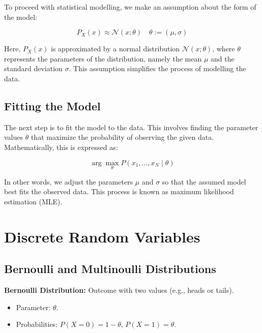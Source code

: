 To proceed with statistical modelling, we make an assumption about the form of the model:

\begin{equation}
P_X(x) \approx \mathcal{N}(x; \theta) \quad \theta := (\mu, \sigma)
\end{equation}

Here, \(P_X(x)\) is approximated by a normal distribution \(\mathcal{N}(x; \theta)\), where \(\theta\) represents the parameters of the distribution, namely the mean \(\mu\) and the standard deviation \(\sigma\). This assumption simplifies the process of modelling the data.

\subsection{Fitting the Model}

The next step is to fit the model to the data. This involves finding the parameter values \(\theta\) that maximize the probability of observing the given data. Mathematically, this is expressed as:

\begin{equation}
\arg \max_{\theta} P(x_1, \ldots, x_N \mid \theta)
\end{equation}

In other words, we adjust the parameters \(\mu\) and \(\sigma\) so that the assumed model best fits the observed data. This process is known as maximum likelihood estimation (MLE).\\











\section{Discrete Random Variables}


\subsection{Bernoulli and Multinoulli Distributions}
\textbf{Bernoulli Distribution:} Outcome with two values (e.g., heads or tails).
\begin{itemize}
    \item Parameter: \(\theta\).
    \item Probabilities: \(P(X = 0) = 1 - \theta\), \(P(X = 1) = \theta\).
\end{itemize}

